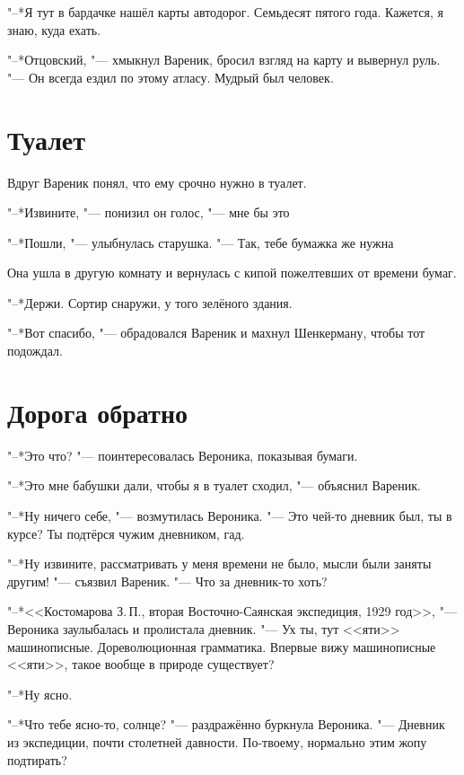 "--*Я тут в бардачке нашёл карты автодорог.
Семьдесят пятого года.
Кажется, я знаю, куда ехать.

"--*Отцовский, "--- хмыкнул Вареник, бросил взгляд на карту и вывернул руль.
"--- Он всегда ездил по этому атласу.
Мудрый был человек.

\section{\spacing}

\section{Туалет}

Вдруг Вареник понял, что ему срочно нужно в туалет.

"--*Извините, "--- понизил он голос, "--- мне бы это\ldotst

"--*Пошли, "--- улыбнулась старушка.
"--- Так, тебе бумажка же нужна\ldotsq

Она ушла в другую комнату и вернулась с кипой пожелтевших от времени бумаг.

"--*Держи.
Сортир снаружи, у того зелёного здания.

"--*Вот спасибо, "--- обрадовался Вареник и махнул Шенкерману, чтобы тот подождал.

\section{Дорога обратно}

"--*Это что? "--- поинтересовалась Вероника, показывая бумаги.

"--*Это мне бабушки дали, чтобы я в туалет сходил, "--- объяснил Вареник.

"--*Ну ничего себе, "--- возмутилась Вероника.
"--- Это чей-то дневник был, ты в курсе?
Ты подтёрся чужим дневником, гад.

"--*Ну извините, рассматривать у меня времени не было, мысли были заняты другим! "--- съязвил Вареник.
"--- Что за дневник-то хоть?

"--*<<Костомарова З.\,П., вторая Восточно-Саянская экспедиция, 1929 год>>, "--- Вероника заулыбалась и пролистала дневник.
"--- Ух ты, тут <<яти>> машинописные.
Дореволюционная грамматика.
Впервые вижу машинописные <<яти>>, такое вообще в природе существует?

"--*Ну ясно.

"--*Что тебе ясно-то, солнце? "--- раздражённо буркнула Вероника.
"--- Дневник из экспедиции, почти столетней давности.
По-твоему, нормально этим жопу подтирать?

